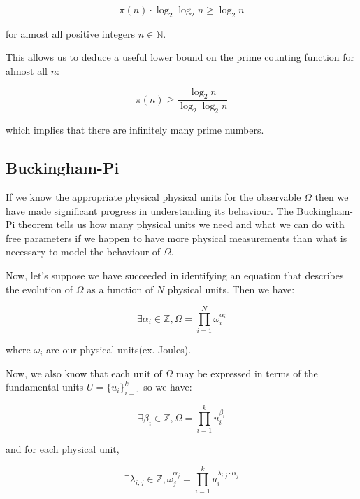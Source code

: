 \documentclass{article}
\begin{document}
\begin{equation}
\pi(n) \cdot \log_2 \log_2 n \geq \log_2 n
\end{equation}

for almost all positive integers $n \in \mathbb{N}$.

This allows us to deduce a useful lower bound on the prime counting function for almost all $n$:

\begin{equation}
\pi(n) \geq \frac{\log_2 n}{\log_2 \log_2 n}
\end{equation}

which implies that there are infinitely many prime numbers.

\subsection{Buckingham-Pi}

If we know the appropriate physical physical units for the observable $\Omega$ then we have made significant
progress in understanding its behaviour. The Buckingham-Pi theorem tells us how many physical units we need
and what we can do with free parameters if we happen to have more physical measurements than what is necessary
to model the behaviour of $\Omega$.

Now, let's suppose we have succeeded in identifying an equation that describes the evolution of $\Omega$ as a function
of $N$ physical units. Then we have:

\begin{equation}
\exists \alpha_i \in \mathbb{Z}, \Omega = \prod_{i=1}^N \omega_i^{\alpha_i} \tag{1}
\end{equation}

where $\omega_i$ are our physical units(ex. Joules).

Now, we also know that each unit of $\Omega$ may be expressed in terms of the fundamental units $U = \{u_i\}_{i=1}^k$
so we have:

\begin{equation}
\exists \beta_i \in \mathbb{Z}, \Omega = \prod_{i=1}^k u_i^{\beta_i} \tag{2}
\end{equation}

and for each physical unit,

\begin{equation}
\exists \lambda_{i,j} \in \mathbb{Z}, \omega_j^{\alpha_j} = \prod_{i=1}^k u_i^{\lambda_{i,j} \cdot \alpha_j} \tag{3}
\end{equation}
\end{document}
